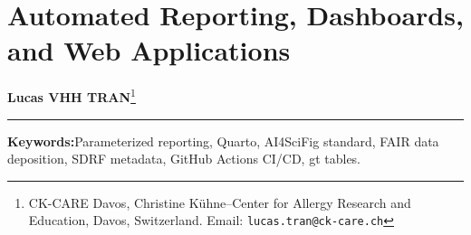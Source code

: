 \documentclass[11pt,twoside,openright]{book}
\begin{document}
\setcounter{chapter}{29}
\chapter{Automated Reporting, Dashboards, and Web Applications}
\label{chap:reproducible_reports}

\noindent
\textbf{Lucas VHH TRAN}\footnote{CK-CARE Davos, Christine K\"uhne--Center for Allergy Research and Education, Davos, Switzerland. Email: \texttt{lucas.tran@ck-care.ch}}\\
\rule{\textwidth}{0.8pt}

\begin{abstract}
\noindent
A scientific finding in computational mass spectrometry is reliable only when the analytical pipeline that generated it can be re-executed deterministically from raw data to published tables and figures. Parameterized literate documents \cite{allaire2022quarto}, pipeline-coupled caching \cite{landau2021targets}, and standardized metadata deposition establish reproducible dissemination. Decoupling the reporting tier from the computation tier is mandatory: analytical pipelines compute and cache intermediate artifacts, whereas reporting documents read pre-computed outputs without triggering redundant re-execution \cite{peng2011reproducible}. Parameterized Quarto templates evaluate multiple clinical cohorts or threshold sweeps dynamically through runtime parameters. Visualizations adhere to the AI4SciFig publication standard, enforcing four-spine enclosed canvases, outward tick marks, colorblind-safe palettes, and exact physical print dimensions (88~mm single-column to 180~mm double-column) \cite{cleveland1985elements, tufte2001visual, wickham2016ggplot2}. For external auditing, research data must conform to FAIR principles \cite{wilkinson2016fair} through ProteomeXchange SDRF \cite{deutsch2020pride, perezriverol2022pride} and MetaboLights ISA-Tab architectures \cite{haug2020metabolights, sansone2012toward}. This chapter presents the architecture of decoupled reporting systems, parameterized template execution, AI4SciFig physical layout metrics, and FAIR metadata validation in R 4.6.1.
\end{abstract}

\vspace{1em}
\noindent\textbf{Keywords:}\enspace Parameterized reporting, Quarto, AI4SciFig standard, FAIR data deposition, SDRF metadata, GitHub Actions CI/CD, gt tables.

\vspace{1em}
\end{document}
